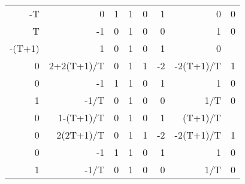 \begin{table}[ht]
\begin{tabular}{rrrlrrrr}
    -T     & 0          & 1  & 1  & 0                                                          & 1                                                          & 0                                                          & 0         \\
    T      & -1         & 0  & 1  & 0                                                          & 0                                                          & 1                                                          & 0         \\
    -(T+1) & 1          & 0  & 1  & 0                                                          & 1                                                          & 0                                                          &           \\ \hline
    0      & 2+2(T+1)/T & 0  & 1  & 1                                                          & -2                                                         & -2(T+1)/T                                                  & 1         \\ \hline
    0      & -1         & 1  & 1  & 0                                                          & 1                                                          & 1                                                          & 0         \\
    1      & -1/T       & 0  & 1  & 0                                                          & 0                                                          & 1/T                                                        & 0         \\
    0      & 1-(T+1)/T  & 0  & 1  & 0                                                          & 1                                                          & (T+1)/T                                                    &           \\ \hline
    0      & 2(2T+1)/T  & 0  & 1  & 1                                                          & -2                                                         & -2(T+1)/T                                                  & 1         \\ \hline
    0      & -1         & 1  & 1  & 0                                                          & 1                                                          & 1                                                          & 0         \\
    1      & -1/T       & 0  & 1  & 0                                                          & 0                                                          & 1/T                                                        & 0         \\

\end{tabular}
\end{table}
